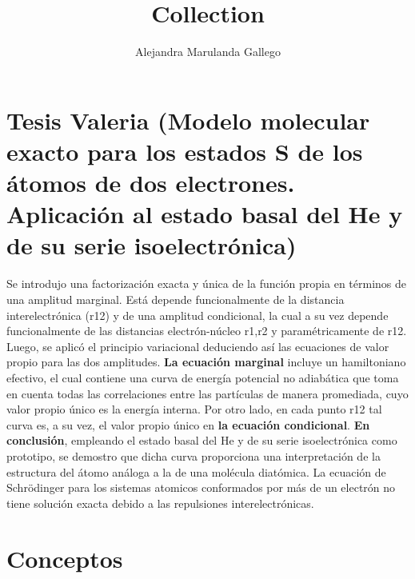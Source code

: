 \documentclass{article}
\title{\bfseries Collection}
\author{Alejandra Marulanda Gallego}
\begin{document}
\maketitle
\section{Tesis Valeria (Modelo molecular exacto para los estados S de los átomos de dos electrones. Aplicación al estado basal del He y de su serie isoelectrónica)}
Se introdujo una factorización exacta y única de la función propia
en términos de una amplitud marginal. Está depende funcionalmente
de la distancia interelectrónica (r12) y de una amplitud condicional,
la cual a su vez depende funcionalmente de las distancias electrón-núcleo
r1,r2 y paramétricamente de r12. Luego, se aplicó el principio variacional 
deduciendo así las ecuaciones de valor propio para las dos amplitudes.\newline
\textbf{La ecuación marginal} incluye un hamiltoniano efectivo, el cual
contiene una curva de energía potencial no adiabática que toma en cuenta 
todas las correlaciones entre las partículas de manera promediada, cuyo 
valor propio único es la energía interna. Por otro lado, en cada punto r12 
tal curva es, a su vez, el valor propio único en \textbf{la ecuación condicional}.\newline
\textbf{En conclusión}, empleando el estado basal del He y de su serie 
isoelectrónica como prototipo, se demostro que dicha curva proporciona una
interpretación de la estructura del átomo análoga a la de una molécula 
diatómica.\newline
La ecuación de Schrödinger para los sistemas atomicos conformados 
por más de un electrón no tiene solución exacta debido a las repulsiones
interelectrónicas.   
\section*{Conceptos}
\end{document}
